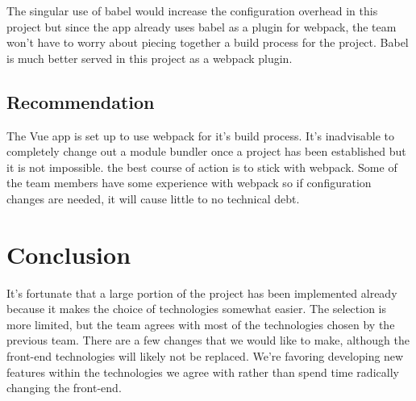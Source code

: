     The singular use of babel would increase the configuration overhead in this project but since the app already uses babel as a plugin for webpack, the team won’t have to worry about piecing together a build process for the project. Babel is much better served in this project as a webpack plugin.
    
    \subsection{Recommendation}
    The Vue app is set up to use webpack for it's build process. It's inadvisable to completely change out a module bundler once a project has been established but it is not impossible. the best course of action is to stick with webpack. Some of the team members have some experience with webpack so if configuration changes are needed, it will cause little to no technical debt.

\section{Conclusion}
It's fortunate that a large portion of the project has been implemented already because it makes the choice of technologies somewhat easier. The selection is more limited, but the team agrees with most of the technologies chosen by the previous team. There are a few changes that we would like to make, although the front-end technologies will likely not be replaced. We're favoring developing new features within the technologies we agree with rather than spend time radically changing the front-end. \\